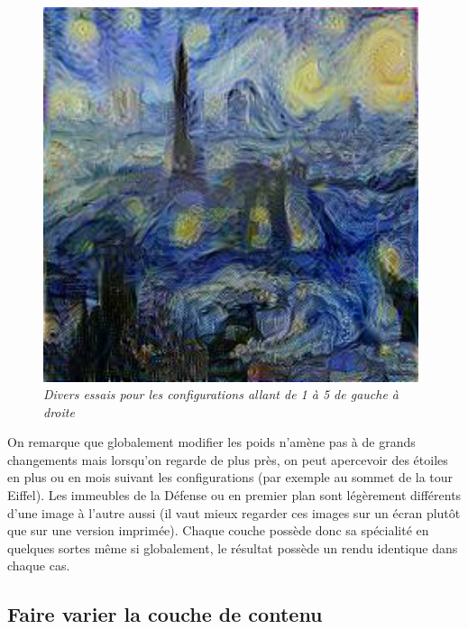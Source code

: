\documentclass{article}
\begin{document}
\begin{figure}[!htb]
\begin{minipage}{0.2\textwidth}
\end{minipage}%
\begin{minipage}{0.2\textwidth}
\centering
\includegraphics[width=0.98\textwidth]{../Images/transfer/paris_starrynight_w_01_01_01_01_06.jpg}
\end{minipage}
\label{fig:varier_poids}
\caption{\textit{Divers essais pour les configurations allant de 1 à 5 de gauche à droite}}
\end{figure}

On remarque que globalement modifier les poids n'amène pas à de grands changements mais lorsqu'on regarde de plus près, on peut apercevoir des étoiles en plus ou en mois suivant les configurations (par exemple au sommet de la tour Eiffel). Les immeubles de la Défense ou en premier plan sont légèrement différents d'une image à l'autre aussi (il vaut mieux regarder ces images sur un écran plutôt que sur une version imprimée). Chaque couche possède donc sa spécialité en quelques sortes même si globalement, le résultat possède un rendu identique dans chaque cas.

\subsection*{Faire varier la couche de contenu}
\end{document}
